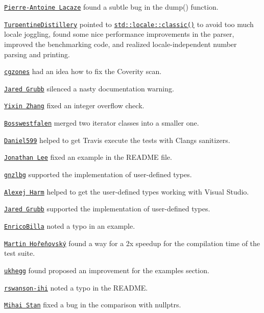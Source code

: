 \begin{DoxyItemize}
\item \href{https://github.com/palacaze}{\tt Pierre-\/\+Antoine Lacaze} found a subtle bug in the {\ttfamily dump()} function.
\item \href{https://github.com/TurpentineDistillery}{\tt Turpentine\+Distillery} pointed to \href{http://en.cppreference.com/w/cpp/locale/locale/classic}{\tt {\ttfamily std\+::locale\+::classic()}} to avoid too much locale joggling, found some nice performance improvements in the parser, improved the benchmarking code, and realized locale-\/independent number parsing and printing.
\item \href{https://github.com/cgzones}{\tt cgzones} had an idea how to fix the Coverity scan.
\item \href{https://github.com/jaredgrubb}{\tt Jared Grubb} silenced a nasty documentation warning.
\item \href{https://github.com/qwename}{\tt Yixin Zhang} fixed an integer overflow check.
\item \href{https://github.com/Bosswestfalen}{\tt Bosswestfalen} merged two iterator classes into a smaller one.
\item \href{https://github.com/Daniel599}{\tt Daniel599} helped to get Travis execute the tests with Clang\textquotesingle{}s sanitizers.
\item \href{https://github.com/vjon}{\tt Jonathan Lee} fixed an example in the R\+E\+A\+D\+ME file.
\item \href{https://github.com/gnzlbg}{\tt gnzlbg} supported the implementation of user-\/defined types.
\item \href{https://github.com/qis}{\tt Alexej Harm} helped to get the user-\/defined types working with Visual Studio.
\item \href{https://github.com/jaredgrubb}{\tt Jared Grubb} supported the implementation of user-\/defined types.
\item \href{https://github.com/EnricoBilla}{\tt Enrico\+Billa} noted a typo in an example.
\item \href{https://github.com/horenmar}{\tt Martin Hořeňovský} found a way for a 2x speedup for the compilation time of the test suite.
\item \href{https://github.com/ukhegg}{\tt ukhegg} found proposed an improvement for the examples section.
\item \href{https://github.com/rswanson-ihi}{\tt rswanson-\/ihi} noted a typo in the R\+E\+A\+D\+ME.
\item \href{https://github.com/stanmihai4}{\tt Mihai Stan} fixed a bug in the comparison with {\ttfamily nullptr}s.

\end{DoxyItemize}
